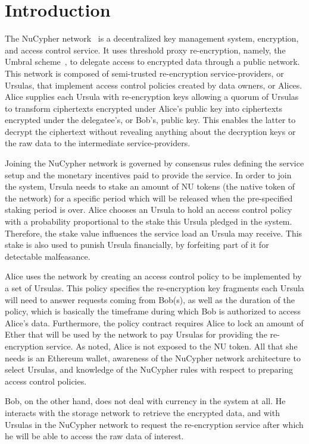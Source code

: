 \section{Introduction}
\label{intro}
The NuCypher network~\cite{nucypher,egorov2017nucypher} is a decentralized key management system, encryption, and access control service. It uses threshold proxy re-encryption, namely, the Umbral scheme~\cite{umbral2018}, to delegate access to encrypted data through a public network. This network is composed of semi-trusted re-encryption service-providers, or Ursulas, that implement access control policies created by data 
owners, or Alices. Alice supplies each Ursula with re-encryption keys allowing a quorum of Ursulas to transform 
ciphertexts encrypted under Alice's public key into ciphertexts encrypted under the delegatee's, or Bob's, public key. This enables the latter to decrypt the ciphertext without revealing anything about the decryption keys or the raw data to the intermediate service-providers. 


Joining the NuCypher network is governed by consensus rules defining the service setup and the monetary incentives paid to provide the service. In order to join the system, Ursula needs to stake an amount of NU tokens (the native token of the network) for a specific period which will be released when the pre-specified staking period is over. Alice chooses an Ursula to hold an access control policy with a probability proportional to the stake this Ursula pledged in the system. Therefore, the stake value influences the service load an Ursula may receive. This stake is also used to punish Ursula financially, by forfeiting part of it for detectable malfeasance. 


Alice uses the network by creating an access control policy to be implemented by a set of Ursulas. This policy specifies the re-encryption key fragments each Ursula will need to answer requests coming from Bob(s), as well as the duration of the policy, which is basically the timeframe during which Bob is authorized to access Alice's data. Furthermore, the policy contract requires Alice to lock an amount of Ether that will be used by the network to pay Ursulas for providing the re-encryption service. As noted, Alice is not exposed to the NU token. All that she needs is an Ethereum wallet, awareness of the NuCypher network architecture to select Ursulas, and knowledge of the NuCypher rules with respect to preparing access control policies.


Bob, on the other hand, does not deal with currency in the system at all. He interacts with the storage network to retrieve the encrypted data, and with Ursulas in the NuCypher network to request the re-encryption service after which he will be able to access the raw data of interest.


